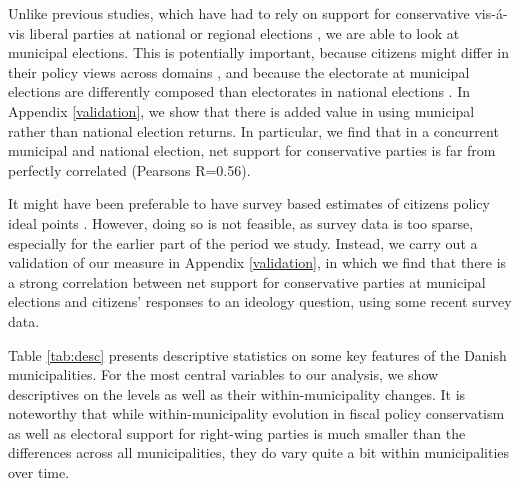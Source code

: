 \documentclass[a4paper,12pt]{article}
\begin{document}
 Unlike previous studies, which have had to rely on support for conservative vis-á-vis liberal parties at national or regional elections \citep[e.g.,][]{hajnal2010or,einstein2016pushing}, we are able to look at municipal elections. This is potentially important, because citizens might differ in their policy views across domains \cite[for an argument along these lines, see]{abrams2012big}, and because the electorate at municipal elections are differently composed than electorates in national elections \citep{ansolabehere2015beyond}. In Appendix  \ref{validation}, we show that there is added value in using municipal rather than national election returns. In particular, we find that in a concurrent municipal and national election, net support for conservative parties is far from perfectly correlated (Pearsons R=0.56).
 
 It might have been preferable to have survey based estimates of citizens policy ideal points \citep[similar to the measure used by][]{tausanovitch2014representation}. However, doing so is not feasible, as survey data is too sparse, especially for the earlier part of the period we study. Instead, we carry out a validation of our measure in Appendix \ref{validation}, in which we find that there is a strong correlation between net support for conservative parties at municipal elections and citizens' responses to an ideology question, using some recent survey data.

Table \ref{tab:desc} presents descriptive statistics on some key features of the Danish municipalities. For the most central variables to our analysis, we show descriptives on the levels as well as their within-municipality changes. It is noteworthy that while within-municipality evolution in fiscal policy conservatism as well as electoral support for right-wing parties is much smaller than the differences across all municipalities, they do vary quite a bit within municipalities over time.
\end{document}
